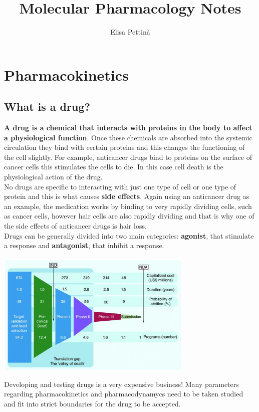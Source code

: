 \documentclass{book}
\title{Molecular Pharmacology Notes}
\author{Elisa Pettinà}
\begin{document}
\maketitle

\chapter{Pharmacokinetics}
\section{{What is a drug?}}
\textbf{A drug is a chemical that interacts with proteins in the body to affect a physiological function}.
Once these chemicals are absorbed into the systemic circulation they bind with certain proteins and this changes the functioning of the cell slightly. 
For example, anticancer drugs bind to proteins on the surface of cancer cells this stimulates the cells to die. 
In this case cell death is the physiological action of the drug.
\\
No drugs are specific to interacting with just one type of cell or one type of protein
and this is what causes \textbf{side effects}. 
Again using an anticancer drug as an example, the medication works by binding to very rapidly dividing cells, such as cancer cells, however hair cells are also rapidly dividing and that is why one of the side effects of anticancer drugs is hair loss.
\\
Drugs can be generally divided into two main categories: \textbf{agonist}, that stimulate a response and \textbf{antagonist}, that inhibit a response.

\includegraphics[width=0.7\textwidth, center]{images/image.png}

Developing and testing drugs is a very expensive business!
Many parameters regarding pharmacokinetics and pharmacodynamycs need to be taken studied and fit into strict boundaries for the drug to be accepted.
\end{document}
